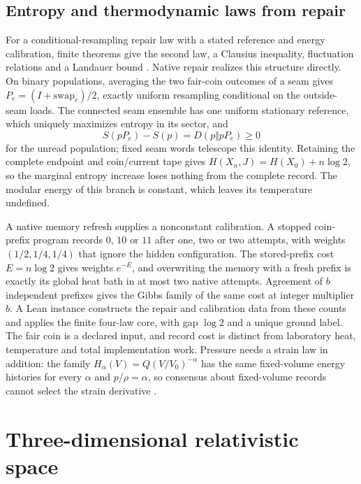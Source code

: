 \documentclass[11pt]{article}
\theoremstyle{definition}
\theoremstyle{remark}
\begin{document}
\subsection{Entropy and thermodynamic laws from repair}
\label{sec:thermodynamics}

For a conditional-resampling repair law with a stated reference and energy
calibration, finite theorems give the second law, a Clausius inequality,
fluctuation relations and a Landauer bound \cite{ophobservers}. Native repair
realizes this structure directly. On binary populations, averaging the two
fair-coin outcomes of a seam gives $P_e=(I+\mathrm{swap}_e)/2$, exactly uniform
resampling conditional on the outside-seam loads. The connected seam ensemble has
one uniform stationary reference, which uniquely maximizes entropy in its sector,
and
\[
 S(pP_e)-S(p)=D(p\Vert pP_e)\geq0
\]
for the unread population; fixed seam words telescope this identity. Retaining the
complete endpoint and coin/current tape gives $H(X_n,J)=H(X_0)+n\log2$, so the
marginal entropy increase loses nothing from the complete record. The modular
energy of this branch is constant, which leaves its temperature undefined.

A native memory refresh supplies a nonconstant calibration. A stopped coin-prefix
program records $0$, $10$ or $11$ after one, two or two attempts, with weights
$(1/2,1/4,1/4)$ that ignore the hidden configuration. The stored-prefix cost
$E=n\log2$ gives weights $e^{-E}$, and overwriting the memory with a fresh prefix
is exactly its global heat bath in at most two native attempts. Agreement of $b$
independent prefixes gives the Gibbs family of the same cost at integer multiplier
$b$. A Lean instance constructs the repair and calibration data from these counts
and applies the finite four-law core, with gap $\log2$ and a unique ground label.
The fair coin is a declared input, and record cost is distinct from laboratory
heat, temperature and total implementation work. Pressure needs a strain law in
addition: the family $H_\alpha(V)=Q(V/V_0)^{-\alpha}$ has the same fixed-volume
energy histories for every $\alpha$ and $p/\rho=\alpha$, so consensus about
fixed-volume records cannot select the strain derivative \cite{ophobservers}.

\section{Three-dimensional relativistic space}
\label{sec:three-directions}
\end{document}
